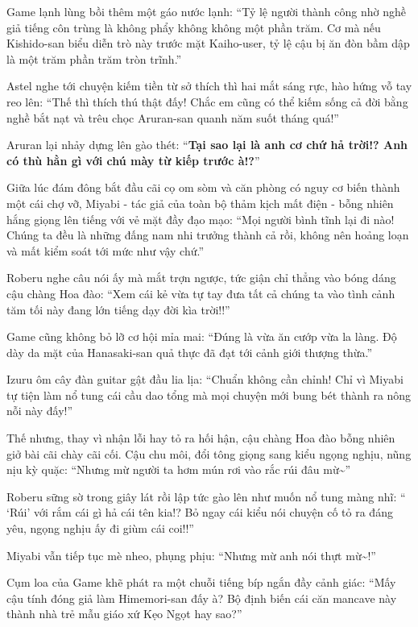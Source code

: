 \documentclass[../main.tex]{subfiles}
\begin{document}
Game lạnh lùng bồi thêm một gáo nước lạnh: ``Tỷ lệ người thành công nhờ nghề giả tiếng côn trùng là không phẩy không không một phần trăm. Cơ mà nếu Kishido-san biểu diễn trò này trước mặt Kaiho-user, tỷ lệ cậu bị ăn đòn bầm dập là một trăm phần trăm tròn trĩnh.''

Astel nghe tới chuyện kiếm tiền từ sở thích thì hai mắt sáng rực, hào hứng vỗ tay reo lên: ``Thế thì thích thú thật đấy! Chắc em cũng có thể kiếm sống cả đời bằng nghề bắt nạt và trêu chọc Aruran-san quanh năm suốt tháng quá!''

Aruran lại nhảy dựng lên gào thét: ``\textbf{Tại sao lại là anh cơ chứ hả trời!? Anh có thù hằn gì với chú mày từ kiếp trước à!?}''

Giữa lúc đám đông bắt đầu cãi cọ om sòm và căn phòng có nguy cơ biến thành một cái chợ vỡ, Miyabi - tác giả của toàn bộ thảm kịch mất điện - bỗng nhiên hắng giọng lên tiếng với vẻ mặt đầy đạo mạo: ``Mọi người bình tĩnh lại đi nào! Chúng ta đều là những đấng nam nhi trưởng thành cả rồi, không nên hoảng loạn và mất kiểm soát tới mức như vậy chứ.''

Roberu nghe câu nói ấy mà mắt trợn ngược, tức giận chỉ thẳng vào bóng dáng cậu chàng Hoa đào: ``Xem cái kẻ vừa tự tay đưa tất cả chúng ta vào tình cảnh tăm tối này đang lớn tiếng dạy đời kìa trời!!''

Game cũng không bỏ lỡ cơ hội mỉa mai: ``Đúng là vừa ăn cướp vừa la làng. Độ dày da mặt của Hanasaki-san quả thực đã đạt tới cảnh giới thượng thừa.''

Izuru ôm cây đàn guitar gật đầu lia lịa: ``Chuẩn không cần chỉnh! Chỉ vì Miyabi tự tiện làm nổ tung cái cầu dao tổng mà mọi chuyện mới bung bét thành ra nông nỗi này đấy!''

Thế nhưng, thay vì nhận lỗi hay tỏ ra hối hận, cậu chàng Hoa đào bỗng nhiên giở bài cãi chày cãi cối. Cậu chu môi, đổi tông giọng sang kiểu ngọng nghịu, nũng nịu kỳ quặc: ``Nhưng mừ người ta hơm mún rơi vào rắc rúi đâu mừ\~{}''

Roberu sững sờ trong giây lát rồi lập tức gào lên như muốn nổ tung màng nhĩ: `` `Rúi' với rắm cái gì hả cái tên kia!? Bỏ ngay cái kiểu nói chuyện cố tỏ ra đáng yêu, ngọng nghịu ấy đi giùm cái coi!!''

Miyabi vẫn tiếp tục mè nheo, phụng phịu: ``Nhưng mừ anh nói thựt mừ\~{}!''

Cụm loa của Game khẽ phát ra một chuỗi tiếng bíp ngắn đầy cảnh giác: ``Mấy cậu tính đóng giả làm Himemori-san đấy à? Bộ định biến cái căn mancave này thành nhà trẻ mẫu giáo xứ Kẹo Ngọt hay sao?''
\end{document}
